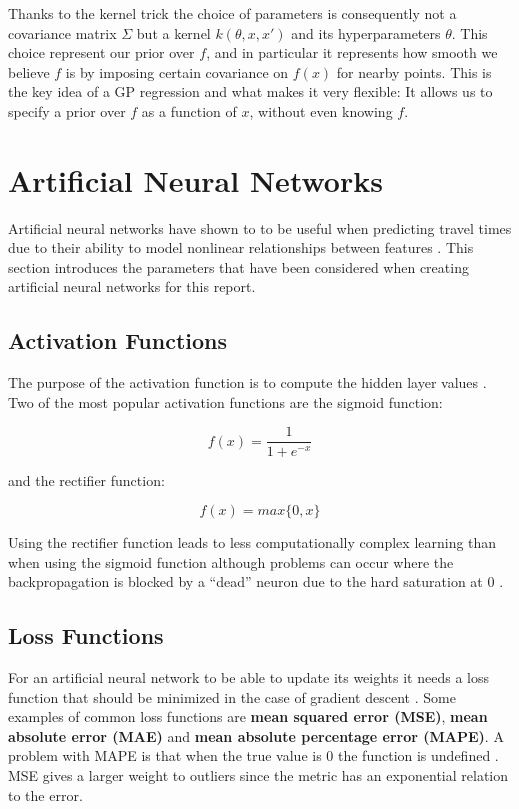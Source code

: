 Thanks to the kernel trick the choice of parameters is consequently not a covariance matrix $\Sigma$ but a kernel $k(\theta, x, x')$ and its hyperparameters $\theta$. This choice represent our prior over $f$, and in particular it represents how smooth we believe $f$ is by imposing certain covariance on $f(x)$ for nearby points. This is the key idea of a GP regression and what makes it very flexible: It allows us to specify a prior over $f$ as a function of $x$, without even knowing $f$.

\section{Artificial Neural Networks}
Artificial neural networks have shown to to be useful when predicting travel times due to their ability to model nonlinear relationships between features \cite{brazilANN}\cite{malaysiaANN}. This section introduces the parameters that have been considered when creating artificial neural networks for this report.

\subsection{Activation Functions}
The purpose of the activation function is to compute the hidden layer values \cite{Goodfellow-et-al-2016}. Two of the most popular activation functions are the sigmoid function:

\begin{equation} 
	f(x) = \frac{1}{1+e^{-x}} 
\end{equation}

and the rectifier function:

\begin{equation} 
	f(x) = max\{0,x\}
\end{equation}

Using the rectifier function leads to less computationally complex learning than when using the sigmoid function although problems can occur where the backpropagation is blocked by a ``dead'' neuron due to the hard saturation at 0 \cite{pmlr-v15-glorot11a}.

 \subsection{Loss Functions}
For an artificial neural network to be able to update its weights it needs a loss function that should be minimized in the case of gradient descent \cite{Goodfellow-et-al-2016}. Some examples of common loss functions are \textbf{mean squared error (MSE)}, \textbf{mean absolute error (MAE)} and \textbf{mean absolute percentage error (MAPE)}. A problem with MAPE is that when the true value is 0 the function is undefined \cite{MAPE}. MSE gives a larger weight to outliers since the metric has an exponential relation to the error.

